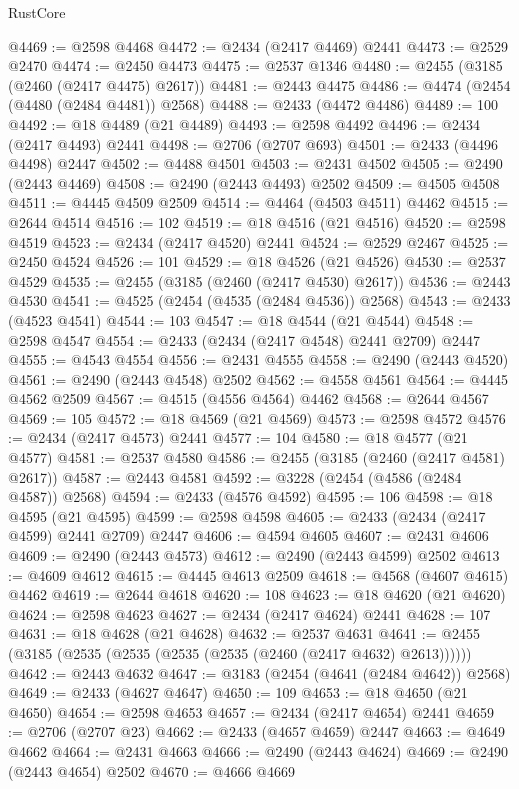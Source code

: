 \begin{lexlean}{RustCore}
\begin{coremodule}
@4469 := @2598 @4468
@4472 := @2434 (@2417 @4469) @2441
@4473 := @2529 @2470
@4474 := @2450 @4473
@4475 := @2537 @1346
@4480 := @2455 (@3185 (@2460 (@2417 @4475) @2617))
@4481 := @2443 @4475
@4486 := @4474 (@2454 (@4480 (@2484 @4481)) @2568)
@4488 := @2433 (@4472 @4486)
@4489 := 100
@4492 := @18 @4489 (@21 @4489)
@4493 := @2598 @4492
@4496 := @2434 (@2417 @4493) @2441
@4498 := @2706 (@2707 @693)
@4501 := @2433 (@4496 @4498) @2447
@4502 := @4488 @4501
@4503 := @2431 @4502
@4505 := @2490 (@2443 @4469)
@4508 := @2490 (@2443 @4493) @2502
@4509 := @4505 @4508
@4511 := @4445 @4509 @2509
@4514 := @4464 (@4503 @4511) @4462
@4515 := @2644 @4514
@4516 := 102
@4519 := @18 @4516 (@21 @4516)
@4520 := @2598 @4519
@4523 := @2434 (@2417 @4520) @2441
@4524 := @2529 @2467
@4525 := @2450 @4524
@4526 := 101
@4529 := @18 @4526 (@21 @4526)
@4530 := @2537 @4529
@4535 := @2455 (@3185 (@2460 (@2417 @4530) @2617))
@4536 := @2443 @4530
@4541 := @4525 (@2454 (@4535 (@2484 @4536)) @2568)
@4543 := @2433 (@4523 @4541)
@4544 := 103
@4547 := @18 @4544 (@21 @4544)
@4548 := @2598 @4547
@4554 := @2433 (@2434 (@2417 @4548) @2441 @2709) @2447
@4555 := @4543 @4554
@4556 := @2431 @4555
@4558 := @2490 (@2443 @4520)
@4561 := @2490 (@2443 @4548) @2502
@4562 := @4558 @4561
@4564 := @4445 @4562 @2509
@4567 := @4515 (@4556 @4564) @4462
@4568 := @2644 @4567
@4569 := 105
@4572 := @18 @4569 (@21 @4569)
@4573 := @2598 @4572
@4576 := @2434 (@2417 @4573) @2441
@4577 := 104
@4580 := @18 @4577 (@21 @4577)
@4581 := @2537 @4580
@4586 := @2455 (@3185 (@2460 (@2417 @4581) @2617))
@4587 := @2443 @4581
@4592 := @3228 (@2454 (@4586 (@2484 @4587)) @2568)
@4594 := @2433 (@4576 @4592)
@4595 := 106
@4598 := @18 @4595 (@21 @4595)
@4599 := @2598 @4598
@4605 := @2433 (@2434 (@2417 @4599) @2441 @2709) @2447
@4606 := @4594 @4605
@4607 := @2431 @4606
@4609 := @2490 (@2443 @4573)
@4612 := @2490 (@2443 @4599) @2502
@4613 := @4609 @4612
@4615 := @4445 @4613 @2509
@4618 := @4568 (@4607 @4615) @4462
@4619 := @2644 @4618
@4620 := 108
@4623 := @18 @4620 (@21 @4620)
@4624 := @2598 @4623
@4627 := @2434 (@2417 @4624) @2441
@4628 := 107
@4631 := @18 @4628 (@21 @4628)
@4632 := @2537 @4631
@4641 := @2455 (@3185 (@2535 (@2535 (@2535 (@2535 (@2460 (@2417 @4632) @2613))))))
@4642 := @2443 @4632
@4647 := @3183 (@2454 (@4641 (@2484 @4642)) @2568)
@4649 := @2433 (@4627 @4647)
@4650 := 109
@4653 := @18 @4650 (@21 @4650)
@4654 := @2598 @4653
@4657 := @2434 (@2417 @4654) @2441
@4659 := @2706 (@2707 @23)
@4662 := @2433 (@4657 @4659) @2447
@4663 := @4649 @4662
@4664 := @2431 @4663
@4666 := @2490 (@2443 @4624)
@4669 := @2490 (@2443 @4654) @2502
@4670 := @4666 @4669

\end{coremodule}
\end{lexlean}
